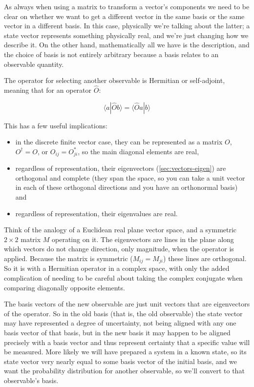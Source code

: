 As always when using a matrix to transform a vector's components we need to be clear on whether we want to get a different vector in the same basis or the same vector in a different basis. In this case, physically we're talking about the latter; a state vector represents something physically real, and we're just changing how we describe it. On the other hand, mathematically all we have is the description, and the choice of basis is not entirely arbitrary because a basis relates to an observable quantity.

The operator for selecting another observable is Hermitian or self-adjoint, meaning that for an operator $\hat{O}$:

$$\langle a|\hat{O} b \rangle = \langle \hat{O} a| b \rangle$$

This has a few useful implications:

\begin{itemize}
  \item in the discrete finite vector case, they can be represented as a matrix $O$, $O^{\dagger} = O$, or $O_{ij} = O_{ji}^*$, so the main diagonal elements are real,
  \item regardless of representation, their eigenvectors (\ref{sec:vectors-eigen}) are orthogonal and complete (they span the space, so you can take a unit vector in each of these orthogonal directions and you have an orthonormal basis) and
  \item regardless of representation, their eigenvalues are real.
\end{itemize}

Think of the analogy of a Euclidean real plane vector space, and a symmetric $2 \times 2$ matrix $M$ operating on it. The eigenvectors are lines in the plane along which vectors do not change direction, only magnitude, when the operator is applied. Because the matrix is symmetric ($M_{ij} = M_{ji}$) these lines are orthogonal. So it is with a Hermitian operator in a complex space, with only the added complication of needing to be careful about taking the complex conjugate when comparing diagonally opposite elements.

The basis vectors of the new observable are just unit vectors that are eigenvectors of the operator. So in the old basis (that is, the old observable) the state vector may have represented a degree of uncertainty, not being aligned with any one basis vector of that basis, but in the new basis it may happen to be aligned precisely with a basis vector and thus represent certainty that a specific value will be measured. More likely we will have prepared a system in a known state, so its state vector very nearly equal to some basis vector of the initial basis, and we want the probability distribution for another observable, so we'll convert to that observable's basis.

